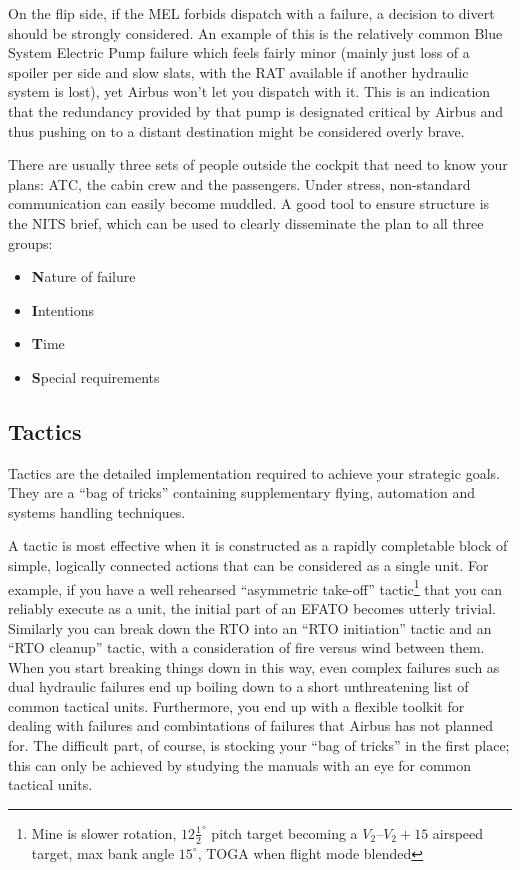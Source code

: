 \documentclass[a5paper,11pt,titlepage]{article}
\begin{document}
On the flip side, if the MEL forbids dispatch with a failure, a decision
to divert should be strongly considered. An example of this is the
relatively common Blue System Electric Pump failure which feels fairly
minor (mainly just loss of a spoiler per side and slow slats, with the
RAT available if another hydraulic system is lost), yet Airbus won't let
you dispatch with it. This is an indication that the redundancy provided
by that pump is designated critical by Airbus and thus pushing on to
a distant destination might be considered overly brave.

There are usually three sets of people outside the cockpit that need to
know your plans: ATC, the cabin crew and the passengers. Under stress,
non-standard communication can easily become muddled. A good tool to
ensure structure is the NITS brief, which can be used to clearly
disseminate the plan to all three groups:

\begin{itemize}
\item \textbf{N}ature of failure
\item \textbf{I}ntentions
\item \textbf{T}ime
\item \textbf{S}pecial requirements
\end{itemize}

\subsection{Tactics}

Tactics are the detailed implementation required to achieve your
strategic goals. They are a ``bag of tricks'' containing supplementary
flying, automation and systems handling techniques.

A tactic is most effective when it is constructed as a rapidly
completable block of simple, logically connected actions that can be
considered as a single unit. For example, if you have a well rehearsed
``asymmetric take-off'' tactic\footnote{Mine is slower rotation,
  $12\frac{1}{2}^\circ$ pitch target becoming a $V_2$--$V_2+15$ airspeed
  target, max bank angle $15^\circ$, TOGA when flight mode blended} that
you can reliably execute as a unit, the initial part of an EFATO becomes
utterly trivial. Similarly you can break down the RTO into an ``RTO
initiation'' tactic and an ``RTO cleanup'' tactic, with a consideration
of fire versus wind between them. When you start breaking things down in
this way, even complex failures such as dual hydraulic failures end up
boiling down to a short unthreatening list of common tactical
units. Furthermore, you end up with a flexible toolkit for dealing with
failures and combintations of failures that Airbus has not planned
for. The difficult part, of course, is stocking your ``bag of tricks''
in the first place; this can only be achieved by studying the manuals
with an eye for common tactical units.
\end{document}
